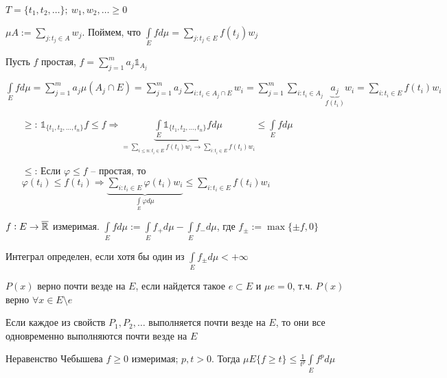 \documentclass[12pt]{article}
\begin{document}
\begin{Example}{}
    $T = \{t_1, t_2, \ldots\};\ w_1, w_2, \ldots \geq 0$

    $\mu A := \sum\limits_{j : t_j \in A} w_j$. Поймем, что $\int\limits_E fd\mu = \sum\limits_{j : t_j \in E} f(t_j)w_j$

    Пусть $f$ простая, $f = \sum\limits_{j = 1}^m a_j \mathbb{1}_{A_j}$

    $\int\limits_E fd\mu = \sum\limits_{j = 1}^m a_j\mu(A_j \cap E) = \sum\limits_{j = 1}^m a_j \sum\limits_{i : t_i \in A_j \cap E} w_i = \sum\limits_{j = 1}^m \sum\limits_{i : t_i \in A_j} \underbrace{a_j}_{f(t_i)} w_i = \sum\limits_{i : t_i \in E} f(t_i)w_i$

    \begin{itemize}
        \item[$\geq$: ] $\mathbb{1}_{\{t_1, t_2, \ldots, t_n\}} f \leq f \Rightarrow \underbrace{\int\limits_E \mathbb{1}_{\{t_1, t_2, \ldots, t_n\}} fd\mu}_{= \sum\limits_{i \leq n : t_i \in E} f(t_i)w_i \to \sum\limits_{i : t_i \in E} f(t_i)w_i} \leq \int\limits_E fd\mu$
        \item[$\leq$: ] Если $\varphi \leq f$ -- простая, то $\varphi(t_i) \leq f(t_i) \Rightarrow \underbrace{\sum\limits_{i : t_i \in E} \varphi(t_i)w_i}_{\int\limits_E \varphi d\mu} \leq \sum\limits_{i : t_i \in E} f(t_i)w_i$
    \end{itemize}
\end{Example}

\begin{defin}{}
    $f : E \to \overline{\mathbb R}$ измеримая. $\int\limits_E fd\mu := \int\limits_E f_+d\mu - \int\limits_E f_-d\mu$, где $f_\pm := \max\{\pm f, 0\}$

    Интеграл определен, если хотя бы один из $\int\limits_E f_\pm d\mu < + \infty$
\end{defin}

\begin{defin}{}
    $P(x)$ верно почти везде на $E$, если найдется такое $e \subset E$ и $\mu e = 0$, т.ч. $P(x)$ верно $\forall x \in E \setminus e$
\end{defin}

\begin{Remark}{}
    Если каждое из свойств $P_1, P_2, \ldots$ выполняется почти везде на $E$, то они все одновременно выполняются почти везде на $E$
\end{Remark}

\begin{theo}{Неравенство Чебышева}
    $f \geq 0$ измеримая; $p, t > 0$. Тогда $\mu E\{f \geq t\} \leq \frac{1}{t^p} \int\limits_E f^p d\mu$
\end{theo}
\end{document}
